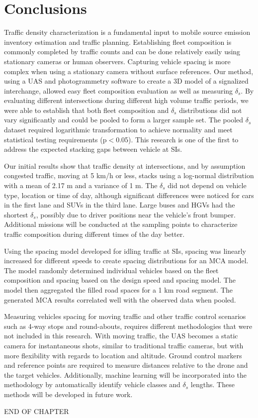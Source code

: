 \section{Conclusions}
Traffic density characterization is a fundamental input to mobile source emission inventory estimation and traffic planning. Establishing fleet composition is commonly completed by traffic counts and can be done relatively easily using stationary cameras or human observers. Capturing vehicle spacing is more complex when using a stationary camera without surface references. Our method, using a UAS and photogrammetry software to create a 3D model of a signalized interchange, allowed easy fleet composition evaluation as well as measuring $\delta_{s}$. By evaluating different intersections during different high volume traffic periods, we were able to establish that both fleet composition and $\delta_{s}$ distributions did not vary significantly and could be pooled to form a larger sample set. The pooled $\delta_{s}$ dataset required logarithmic transformation to achieve normality and meet statistical testing requirements (p$<$0.05). This research is one of the first to address the expected stacking gaps between vehicle at SIs.

Our initial results show that traffic density at intersections, and by assumption congested traffic, moving at 5 km/h or less, stacks using a log-normal distribution with a mean of 2.17 m and a variance of 1 m. The $\delta_{s}$ did not depend on vehicle type, location or time of day, although significant differences were noticed for cars in the first lane and SUVs in the third lane. Large buses and HGVs had the shortest $\delta_{s}$, possibly due to driver positions near the vehicle's front bumper. Additional missions will be conducted at the sampling points to characterize traffic composition during different times of the day better.

Using the spacing model developed for idling traffic at SIs, spacing was linearly increased for different speeds to create spacing distributions for an MCA model. The model randomly determined individual vehicles based on the fleet composition and spacing based on the design speed and spacing model. The model then aggregated the filled road spaces for a 1 km road segment. The generated MCA results correlated well with the observed data when pooled.

Measuring vehicles spacing for moving traffic and other traffic control scenarios such as 4-way stops and round-abouts, requires different methodologies that were not included in this research.
With moving traffic, the UAS becomes a static camera for instantaneous shots, similar to traditional traffic cameras, but with more flexibility with regards to location and altitude. Ground control markers and reference points are required to measure distances relative to the drone and the target vehicles. Additionally, machine learning will be incorporated into the methodology by automatically identify vehicle classes and $\delta_{s}$ lengths. These methods will be developed in future work.

\bigskip
\begin{center}
END OF CHAPTER
\end{center}
